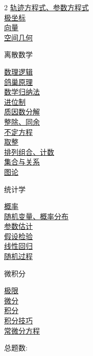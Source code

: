 \documentclass[12pt]{exam}
\begin{document}
\begin{multicols}{2}
\hyperlink{轨迹方程式、参数方程式}{轨迹方程式、参数方程式} \dotfill \pageref{轨迹方程式、参数方程式} \\
\hyperlink{极坐标}{极坐标} \dotfill \pageref{极坐标} \\
\hyperlink{向量}{向量} \dotfill \pageref{向量} \\
\hyperlink{空间几何}{空间几何} \dotfill \pageref{空间几何} 
\begin{center}
    {\Large 离散数学}
\end{center}
\hyperlink{数理逻辑}{数理逻辑} \dotfill \pageref{数理逻辑} \\
\hyperlink{鸽巢原理}{鸽巢原理} \dotfill \pageref{鸽巢原理} \\
\hyperlink{数学归纳法}{数学归纳法} \dotfill \pageref{数学归纳法} \\
\hyperlink{进位制}{进位制} \dotfill \pageref{进位制} \\
\hyperlink{质因数分解}{质因数分解} \dotfill \pageref{质因数分解} \\
\hyperlink{整除、同余}{整除、同余} \dotfill \pageref{整除、同余} \\
\hyperlink{不定方程}{不定方程} \dotfill \pageref{不定方程} \\
\hyperlink{取整}{取整} \dotfill \pageref{取整} \\
\hyperlink{排列组合、计数}{排列组合、计数} \dotfill \pageref{排列组合、计数} \\
\hyperlink{集合与关系}{集合与关系} \dotfill \pageref{集合与关系} \\
\hyperlink{图论}{图论} \dotfill \pageref{图论}
\begin{center}
    {\Large 统计学}
\end{center}
\hyperlink{概率}{概率} \dotfill \pageref{概率} \\
\hyperlink{随机变量、概率分布}{随机变量、概率分布} \dotfill \pageref{随机变量、概率分布} \\
\hyperlink{参数估计}{参数估计} \dotfill \pageref{参数估计} \\
\hyperlink{假设检验}{假设检验} \dotfill \pageref{假设检验} \\
\hyperlink{线性回归}{线性回归} \dotfill \pageref{线性回归} \\
\hyperlink{随机过程}{随机过程} \dotfill \pageref{随机过程}
\begin{center}
    {\Large 微积分}
\end{center}
\hyperlink{极限}{极限} \dotfill \pageref{极限} \\
\hyperlink{微分}{微分} \dotfill \pageref{微分} \\
\hyperlink{积分}{积分} \dotfill \pageref{积分} \\
\hyperlink{积分技巧}{积分技巧} \dotfill \pageref{积分技巧} \\
\hyperlink{常微分方程}{常微分方程} \dotfill \pageref{常微分方程} 
\end{multicols}
\vfill
\noindent 总题数: \numquestions{}
\end{document}

